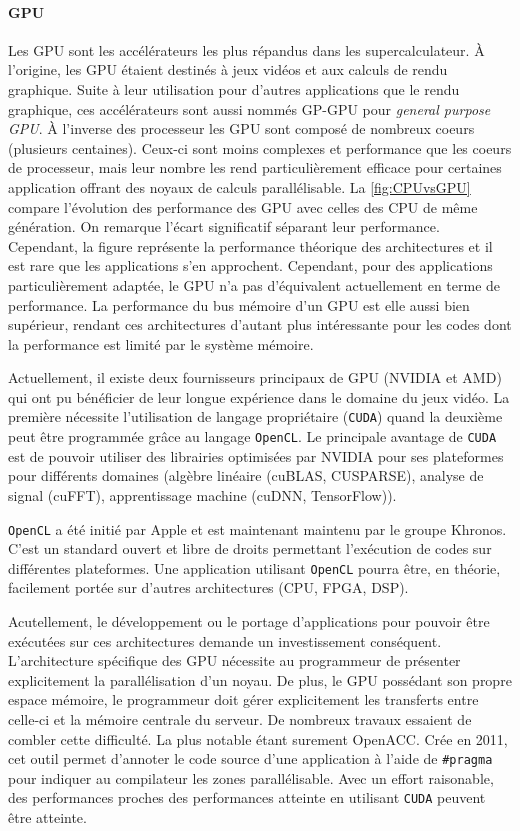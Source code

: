         \paragraph{GPU} Les GPU sont les accélérateurs les plus répandus dans les supercalculateur. À l'origine, les GPU étaient destinés à jeux vidéos et aux calculs de rendu graphique. Suite à leur utilisation pour d'autres applications que le rendu graphique, ces accélérateurs sont aussi nommés GP-GPU pour \textit{general purpose GPU}. 
        À l'inverse des processeur les GPU sont composé de nombreux coeurs (plusieurs centaines). Ceux-ci sont moins complexes et performance que les coeurs de processeur, mais leur nombre les rend particulièrement efficace pour certaines application offrant des noyaux de calculs parallélisable. La \autoref{fig:CPUvsGPU} compare l'évolution des performance des GPU avec celles des CPU de même génération. On remarque l'écart significatif séparant leur performance. Cependant, la figure représente la performance théorique des architectures et il est rare que les applications s'en approchent. Cependant, pour des applications particulièrement adaptée, le GPU n'a pas d'équivalent actuellement en terme de performance. La performance du bus mémoire d'un GPU est elle aussi bien supérieur, rendant ces architectures d'autant plus intéressante pour les codes dont la performance est limité par le système mémoire. 
        
        Actuellement, il existe deux fournisseurs principaux de GPU (NVIDIA et AMD) qui ont pu bénéficier de leur longue expérience dans le domaine du jeux vidéo. La première nécessite l'utilisation de langage propriétaire (\verb|CUDA|) quand la deuxième peut être programmée grâce au langage \verb|OpenCL|. Le principale avantage de \verb|CUDA| est de pouvoir utiliser des librairies optimisées par NVIDIA pour ses plateformes pour différents domaines (algèbre linéaire (cuBLAS, CUSPARSE), analyse de signal (cuFFT), apprentissage machine (cuDNN, TensorFlow)). 
        
        \verb|OpenCL| a été initié par Apple et est maintenant maintenu par le groupe Khronos. C'est un standard ouvert et libre de droits permettant l'exécution de codes sur différentes plateformes. Une application utilisant \verb|OpenCL| pourra être, en théorie, facilement portée sur d'autres architectures (CPU, FPGA, DSP). 

        Acutellement, le développement ou le portage d'applications pour pouvoir être exécutées sur ces architectures demande un investissement conséquent. L'architecture spécifique des GPU nécessite au programmeur de présenter explicitement la parallélisation d'un noyau. De plus, le GPU possédant son propre espace mémoire, le programmeur doit gérer explicitement les transferts entre celle-ci et la mémoire centrale du serveur.
        De nombreux travaux essaient de combler cette difficulté. La plus notable étant surement OpenACC. Crée en 2011, cet outil permet d'annoter le code source d'une application à l'aide de \verb|#pragma| pour indiquer au compilateur les zones parallélisable. Avec un effort raisonable, des performances proches des performances atteinte en utilisant \verb|CUDA| peuvent être atteinte. 
        
